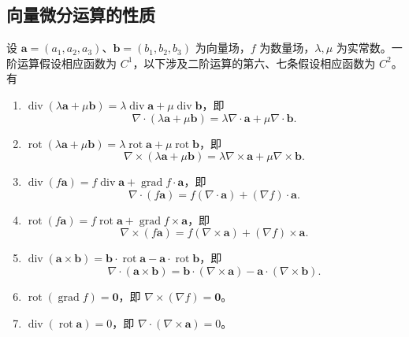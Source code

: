 \subsection*{向量微分运算的性质}
\begin{proposition}
设 $\boldsymbol a=(a_1,a_2,a_3)$、$\boldsymbol b=(b_1,b_2,b_3)$ 为向量场，$f$ 为数量场，$\lambda,\mu$ 为实常数。一阶运算假设相应函数为 $C^1$，以下涉及二阶运算的第六、七条假设相应函数为 $C^2$。有
\begin{enumerate}
\item $\operatorname{div}(\lambda\boldsymbol a+\mu\boldsymbol b)=\lambda\operatorname{div}\boldsymbol a+\mu\operatorname{div}\boldsymbol b$，即
\[
\nabla\cdot(\lambda\boldsymbol a+\mu\boldsymbol b)=\lambda\nabla\cdot\boldsymbol a+\mu\nabla\cdot\boldsymbol b.
\]
\item $\operatorname{rot}(\lambda\boldsymbol a+\mu\boldsymbol b)=\lambda\operatorname{rot}\boldsymbol a+\mu\operatorname{rot}\boldsymbol b$，即
\[
\nabla\times(\lambda\boldsymbol a+\mu\boldsymbol b)=\lambda\nabla\times\boldsymbol a+\mu\nabla\times\boldsymbol b.
\]
\item $\operatorname{div}(f\boldsymbol a)=f\operatorname{div}\boldsymbol a+\operatorname{grad}f\cdot\boldsymbol a$，即
\[
\nabla\cdot(f\boldsymbol a)=f(\nabla\cdot\boldsymbol a)+(\nabla f)\cdot\boldsymbol a.
\]
\item $\operatorname{rot}(f\boldsymbol a)=f\operatorname{rot}\boldsymbol a+\operatorname{grad}f\times\boldsymbol a$，即
\[
\nabla\times(f\boldsymbol a)=f(\nabla\times\boldsymbol a)+(\nabla f)\times\boldsymbol a.
\]
\item $\operatorname{div}(\boldsymbol a\times\boldsymbol b)=\boldsymbol b\cdot\operatorname{rot}\boldsymbol a-\boldsymbol a\cdot\operatorname{rot}\boldsymbol b$，即
\[
\nabla\cdot(\boldsymbol a\times\boldsymbol b)=\boldsymbol b\cdot(\nabla\times\boldsymbol a)-\boldsymbol a\cdot(\nabla\times\boldsymbol b).
\]
\item $\operatorname{rot}(\operatorname{grad}f)=\boldsymbol0$，即 $\nabla\times(\nabla f)=\boldsymbol0$。
\item $\operatorname{div}(\operatorname{rot}\boldsymbol a)=0$，即 $\nabla\cdot(\nabla\times\boldsymbol a)=0$。
\end{enumerate}
\end{proposition}
